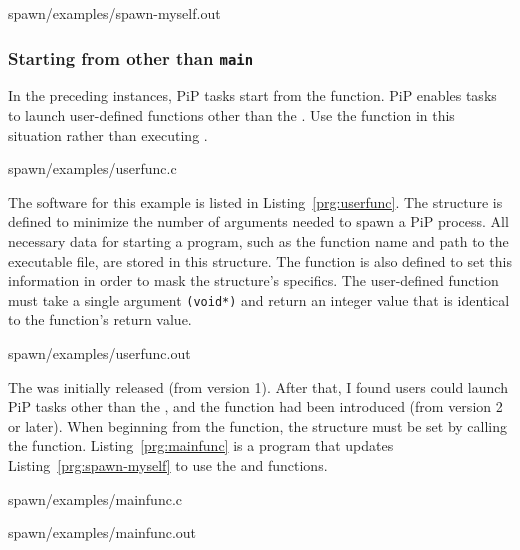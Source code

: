 
                {spawn/examples/spawn-myself.out}

\subsubsection{Starting from other than {\tt main}}\label{sec:spawn-func}

In the preceding instances, PiP tasks start from the {\main}
function. PiP enables tasks to launch user-defined functions other
than the \main. Use the  function in this
situation rather than executing . 

 {spawn/examples/userfunc.c}

The software for this example is listed in
Listing~\ref{prg:userfunc}. The 
structure is defined to minimize the number of arguments 
needed to spawn a PiP process. All necessary data for starting a
program, such as the function name and path to the executable file,
are stored in this structure. The 
function is also defined to set this information in order to mask the
structure's specifics. The user-defined function must take a single
argument {\tt (void*)} and return an integer value that is identical
to the {\main} function's return value.

 {spawn/examples/userfunc.out}

The  was initially released (from version
1). After that, I found users could launch PiP tasks other than the
\main, and the  function had been
introduced (from version 2 or later). When beginning from the 
{\main} function, the  structure must
be set by calling the  function.  
Listing~\ref{prg:mainfunc} is a program that updates
Listing~\ref{prg:spawn-myself} to use the 
and  functions.  


                {spawn/examples/mainfunc.c}

 {spawn/examples/mainfunc.out}


